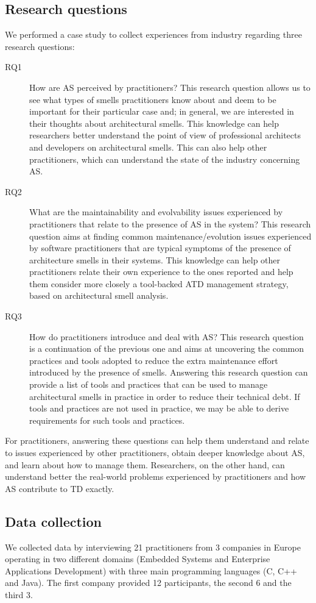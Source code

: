 \subsection{Research questions}
We performed a case study to collect experiences from industry regarding three research questions: 
\begin{description}
	\item[RQ1] How are AS perceived by practitioners?
	This research question allows us to see what types of smells practitioners know about and deem to be important for their particular case and; in general, we are interested in their thoughts about architectural smells. This knowledge can help researchers better understand the point of view of professional architects and developers on architectural smells. This can also help other practitioners, which can understand the state of the industry concerning AS.
	\item[RQ2] What are the maintainability and evolvability issues experienced by practitioners that relate to the presence of AS in the system? 
	This research question aims at finding common maintenance/evolution issues experienced by software practitioners that are typical symptoms of the presence of architecture smells in their systems. This knowledge can help other practitioners relate their own experience to the ones reported and help them consider more closely a tool-backed ATD management strategy, based on architectural smell analysis.
	\item[RQ3] How do practitioners introduce and deal with AS?
	This research question is a continuation of the previous one and aims at uncovering the common practices and tools adopted to reduce the extra maintenance effort introduced by the presence of smells. Answering this research question can provide a list of tools and practices that can be used to manage architectural smells in practice in order to reduce their technical debt. If tools and practices are not used in practice, we may be able to derive requirements for such tools and practices.

\end{description}
For practitioners, answering these questions can help them understand and relate to issues experienced by other practitioners, obtain deeper knowledge about AS, and learn about how to manage them. Researchers, on the other hand, can understand better the real-world problems experienced by practitioners and how AS contribute to TD exactly. 

\subsection{Data collection}
We collected data by interviewing 21 practitioners from 3 companies in Europe operating in two different domains (Embedded Systems and Enterprise Applications Development) with three main programming languages (C, C++ and Java). The first company provided 12 participants, the second 6 and the third 3. 

